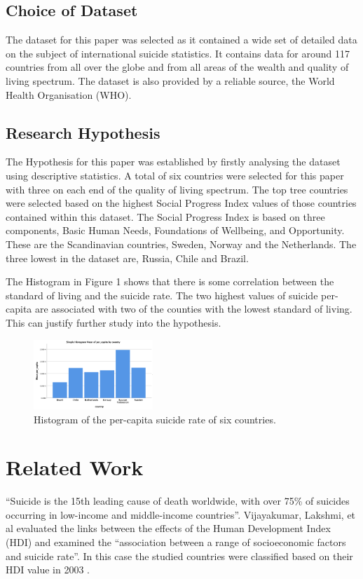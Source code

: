 \documentclass[conference]{IEEEtran}
\begin{document}
\subsection{Choice of Dataset}
The dataset for this paper was selected as it contained a wide set of detailed data on the subject of international suicide statistics.
It contains data for around 117 countries from all over the globe and from all areas of the wealth and quality of living spectrum.
The dataset is also provided by a reliable source, the World Health Organisation (WHO).

\subsection{Research Hypothesis}
The Hypothesis for this paper was established by firstly analysing the dataset using descriptive statistics.
A total of six countries were selected for this paper with three on each end of the quality of living spectrum.
The top tree countries were selected based on the highest Social Progress Index values of those countries contained within this dataset.
The Social Progress Index is based on three components, Basic Human Needs, Foundations of Wellbeing, and Opportunity\cite{high_standard_living}.
These are the Scandinavian countries, Sweden, Norway and the Netherlands.
The three lowest in the dataset are, Russia, Chile and Brazil.

The Histogram in Figure 1 shows that there is some correlation between the standard of living and the suicide rate.
The two highest values of suicide per-capita are associated with two of the counties with the lowest standard of living.
This can justify further study into the hypothesis.
\newline
    \begin{figure}[b]
        \centering
        \includegraphics[width=0.4\textwidth]{percapita_bar}
        \caption{Histogram of the per-capita suicide rate of six countries.}
    \end{figure}

\section{Related Work}
``Suicide is the 15th leading cause of death worldwide, with over 75\% of suicides occurring in low-income and middle-income countries''\cite{sui_low_income}.
Vijayakumar, Lakshmi, et al evaluated the links between the effects of the Human Development Index (HDI) and examined the
``association between a range of socioeconomic factors and suicide rate''.
In this case the studied countries were classified based on their HDI value in 2003 \cite{Sui_in_developing}.
\end{document}

